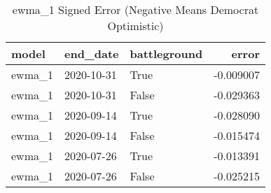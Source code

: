 \begin{table}
\centering
\caption{ewma_1 Signed Error
(Negative Means Democrat Optimistic)}
\begin{tabular}{lllr}
\toprule
  model &    end\_date &  battleground &     error \\
\midrule
 ewma\_1 &  2020-10-31 &          True & -0.009007 \\
 ewma\_1 &  2020-10-31 &         False & -0.029363 \\
 ewma\_1 &  2020-09-14 &          True & -0.028090 \\
 ewma\_1 &  2020-09-14 &         False & -0.015474 \\
 ewma\_1 &  2020-07-26 &          True & -0.013391 \\
 ewma\_1 &  2020-07-26 &         False & -0.025215 \\
\bottomrule
\end{tabular}
\end{table}
